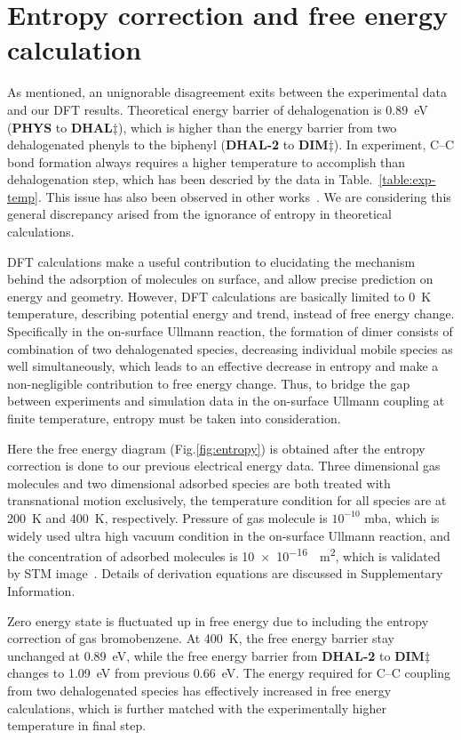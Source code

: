\documentclass[%
 reprint,
 amsmath,amssymb,
 aps,
prb,
floatfix,
]{revtex4-2}
\newcommand{\zhzh}{\color{blue}}
\newcommand{\zhzh}{\color{blue}}
\newcommand{\sinfo}{Supplementary Information}
\begin{document}
\section{Entropy correction and free energy calculation}
{\zhzh
As mentioned, an unignorable disagreement exits between the experimental data and our DFT results. Theoretical energy barrier of dehalogenation is \SI{0.89}{\electronvolt} (\textbf{PHYS} to \textbf{DHAL$\ddagger$}), which is  higher than the energy barrier from two dehalogenated phenyls to the biphenyl (\textbf{DHAL-2} to \textbf{DIM$\ddagger$}). In experiment, C--C bond formation always requires a higher temperature to accomplish than dehalogenation step, which has been descried by the data in Table.~\ref{table:exp-temp}. This issue has also been observed in other works~\cite{jacs2013, pccp2010}. We are considering this general discrepancy arised from the ignorance of entropy in theoretical calculations. 

DFT calculations make a useful contribution to elucidating the mechanism behind the adsorption of molecules on surface, and allow precise prediction on energy and geometry. However, DFT calculations are basically limited to \SI{0}{\kelvin} temperature, describing potential energy and trend, instead of free energy change. Specifically in the on-surface Ullmann reaction, the formation of dimer consists of combination of two dehalogenated species, decreasing individual mobile species as well simultaneously,  which leads to an effective decrease in entropy and make a non-negligible contribution to free energy change. Thus, to bridge the gap between experiments and simulation data in the on-surface Ullmann coupling at finite temperature, entropy must be taken into consideration. 

Here the free energy diagram (Fig.\ref{fig:entropy}) is obtained after the entropy correction is done to our previous electrical energy data. Three dimensional gas molecules and two dimensional adsorbed species are both treated with transnational motion exclusively, the temperature condition for all species are at \SI{200}{\kelvin} and \SI{400}{\kelvin}, respectively. Pressure of gas molecule is $10^{-10}$ mba, which is widely used ultra high vacuum condition in the on-surface Ullmann reaction, and the concentration of adsorbed molecules is \SI{10e-16}{\per\metre\squared}, which is validated by STM image~\cite{ullmann_67}. Details of derivation equations are discussed in \sinfo.

Zero energy state is fluctuated up in free energy due to including the entropy correction of gas bromobenzene. At \SI{400}{\kelvin}, the free energy barrier stay unchanged at \SI{0.89}{\electronvolt}, while the free energy barrier from \textbf{DHAL-2} to \textbf{DIM$\ddagger$} changes to \SI{1.09}{\electronvolt} from previous \SI{0.66}{\electronvolt}. The energy required for C--C coupling from two dehalogenated species has effectively increased in free energy calculations, which is further matched with the experimentally higher temperature in final step.

}
\end{document}
